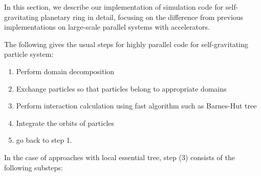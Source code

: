 \documentclass[sigconf]{acmart}
\begin{document}





In this section, we  describe our implementation of simulation code
for self-gravitating planetary ring in detail, focusing on the
difference from previous implementations on large-scale parallel
systems with accelerators.

The following gives the usual steps for highly parallel code for
self-gravitating particle system:

\begin{enumerate}

  \item Perform domain decomposition
  \item Exchange particles so that particles belong to appropriate domains
  \item Perform interaction calculation using fast algorithm such as
    Barnes-Hut tree
  \item Integrate the orbits of particles
  \item go back to step 1.

\end{enumerate}

In the case of approaches with local essential tree, step (3) consists
of the following substeps:
\end{document}
